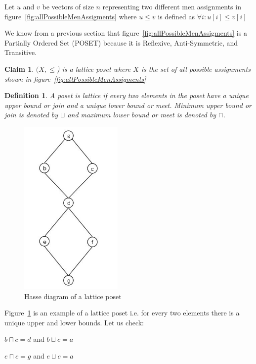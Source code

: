 \documentclass[twoside]{article}
\newtheorem{claim}[theorem]{Claim}
\newtheorem{definition}[theorem]{Definition}
\begin{document}
Let $u$ and $v$ be vectors of size $n$ representing two different men assignments in figure~\ref{fig:allPossibleMenAssigments} where $u \leq v$ is defined as $ \forall i:  u[i] \leq v[i]$

We know from a previous section that figure~\ref{fig:allPossibleMenAssigments} is a Partially Ordered Set (POSET) because it is Reflexive, Anti-Symmetric, and Transitive.

\begin{claim}{$(X, \leq$) is a lattice poset where $X$ is the set of all possible assignments shown in figure~\ref{fig:allPossibleMenAssigments}}
\end{claim}

\begin{definition}{A poset is lattice if every two elements in the poset have a unique upper bound or join and a unique lower bound or meet. Minimum upper bound or join is denoted by $\sqcup$ and maximum lower bound or meet is denoted by $\sqcap$.}
\end{definition}

\begin{figure}[htp]
\centering
\includegraphics[width=5cm]{Hasse_Diagram_Lattice_Example.JPG}
\caption{Hasse diagram of a lattice poset}
\label{fig:latticeExample}
\end{figure}

Figure~\ref{fig:latticeExample} is an example of a lattice poset i.e. for every two elements there is a unique upper and lower bounds. Let us check:

$b \sqcap c = d$ and $b \sqcup c = a$

$e \sqcap c = g$ and $e \sqcup c = a$
\end{document}
